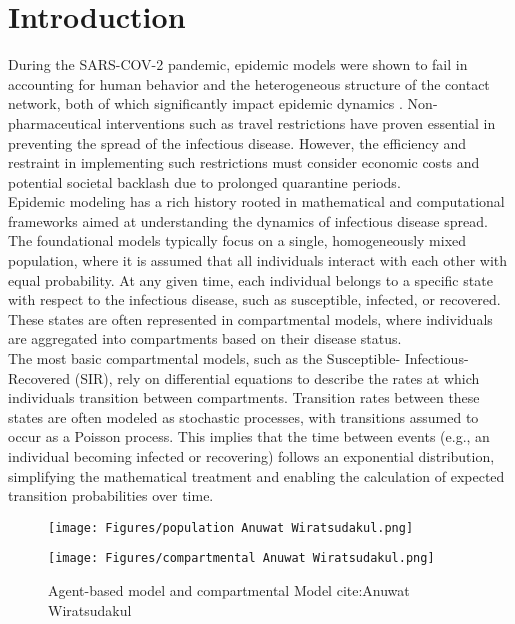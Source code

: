 % 

\section{Introduction}

During the SARS-COV-2 pandemic, epidemic models were shown to fail in accounting for human behavior and the heterogeneous structure of the contact network, both of which significantly impact epidemic dynamics \cite{Lewis2021wrong}. Non-pharmaceutical interventions such as travel restrictions have proven essential in preventing the spread of the infectious disease. However, the efficiency and restraint in implementing such restrictions must consider economic costs and potential societal backlash due to prolonged quarantine periods.\\ 

Epidemic modeling has a rich history rooted in mathematical and computational frameworks aimed at understanding the dynamics of infectious disease spread. The foundational models typically focus on a single, homogeneously mixed population, where it is assumed that all individuals interact with each other with equal probability. At any given time, each individual belongs to a specific state with respect to the infectious disease, such as susceptible, infected, or recovered. These states are often represented in compartmental models, where individuals are aggregated into compartments based on their disease status.\\

The most basic compartmental models, such as the Susceptible- Infectious- Recovered (SIR), rely on differential equations to describe the rates at which individuals transition between compartments. Transition rates between these states are often modeled as stochastic processes, with transitions assumed to occur as a Poisson process. This implies that the time between events (e.g., an individual becoming infected or recovering) follows an exponential distribution, simplifying the mathematical treatment and enabling the calculation of expected transition probabilities over time.\\

\begin{figure}[h]
    \centering
    \begin{minipage}{0.45\textwidth}
        \centering
        \texttt{[image: Figures/population Anuwat Wiratsudakul.png]}
    \end{minipage}
    \hfill
    \begin{minipage}{0.45\textwidth}
        \centering
        \texttt{[image: Figures/compartmental Anuwat Wiratsudakul.png]}
    \end{minipage}
    \caption{Agent-based model and compartmental Model cite:Anuwat Wiratsudakul}
\end{figure}

